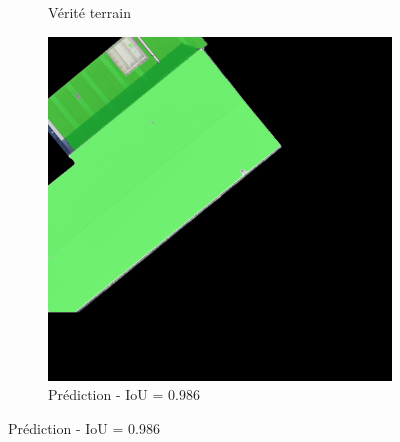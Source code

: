 \begin{figure}[H]
\begin{subfigure}{0.32\textwidth}
    \caption{Vérité terrain}
\end{subfigure}
\hfill
\begin{subfigure}{0.32\textwidth}
    \includegraphics[width=\textwidth]{02-main//figures/ch4/kfold_ensembles/linknet_timm-efficientnet-b5/best_cases/best_3_iou0.986_24931117_tile_18_5_f475a0_overlay_pred.png}
    \caption{Prédiction - IoU = 0.986}
\end{subfigure}

\vspace{0.35cm}


\end{figure}
